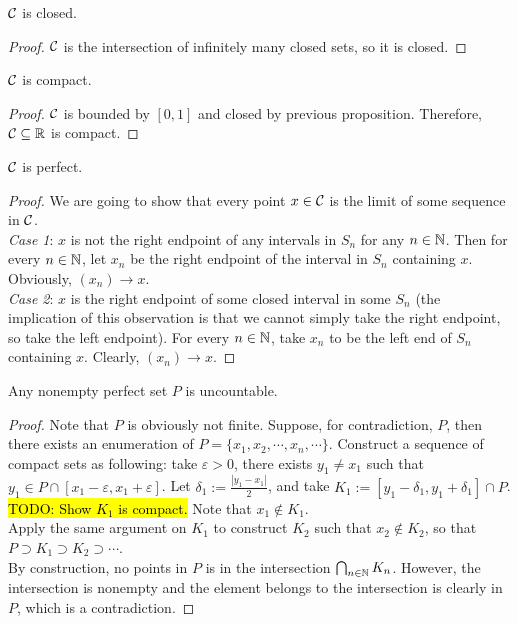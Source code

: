 \documentclass[11pt]{article}
\begin{document}
	\begin{proposition}
		$\mathcal{{C}}$ is closed.
	\end{proposition}
	
	\begin{proof}
		$\mathcal{{C}}$ is the intersection of infinitely many closed sets, so it is closed.
	\end{proof}

	\begin{proposition}
		$\mathcal{{C}}$ is compact.
	\end{proposition}
	
	\begin{proof}
		$\mathcal{{C}}$ is bounded by $[0, 1]$ and closed by previous proposition. Therefore, $\mathcal{{C}} \subseteq \mathbb{R}$ is compact.
	\end{proof}
	
	\begin{proposition}
		$\mathcal{{C}}$ is perfect.
	\end{proposition}
	
	\begin{proof}
		We are going to show that every point $x \in \mathcal{{C}}$ is the limit of some sequence in $\mathcal{{C}}$. \\
		\emph{Case 1}: $x$ is not the right endpoint of any intervals in $S_n$ for any $n \in \mathbb{N}$. Then for every $n \in \mathbb{N}$, let $x_n$ be the right endpoint of the interval in $S_n$ containing $x$. Obviously, $(x_n) \to x$. \\
		\emph{Case 2}: $x$ is the right endpoint of some closed interval in some $S_n$ (the implication of this observation is that we cannot simply take the right endpoint, so take the left endpoint). For every $n \in \mathbb{N}$, take $x_n$ to be the left end of $S_n$ containing $x$. Clearly, $(x_n) \to x$.
	\end{proof}
	
	\begin{theorem}
		Any nonempty perfect set $P$ is uncountable.
	\end{theorem}

	\begin{proof}
		Note that $P$ is obviously not finite. Suppose, for contradiction, $P$, then there exists an enumeration of $P = \{x_1, x_2, \cdots, x_n, \cdots \}$. Construct a sequence of compact sets as following: take $\varepsilon > 0$, there exists $y_1 \neq x_1$ such that $y_1 \in P \cap [x_1 - \varepsilon, x_1 + \varepsilon]$. Let $\delta_1 := \frac{|y_1 - x_1|}{2}$, and take $K_1 := [y_1 - \delta_1, y_1 + \delta_1] \cap P$. \hl{TODO: Show $K_1$ is compact.} Note that $x_1 \notin K_1$. \\
		Apply the same argument on $K_1$ to construct $K_2$ such that $x_2 \notin K_2$, so that $P \supset K_1 \supset K_2 \supset \cdots $. \\
		By construction, no points in $P$ is in the intersection $\bigcap_{n \in \mathbb{N}} K_n$. However, the intersection is nonempty and the element belongs to the intersection is clearly in $P$, which is a contradiction. 
	\end{proof}
\end{document}
